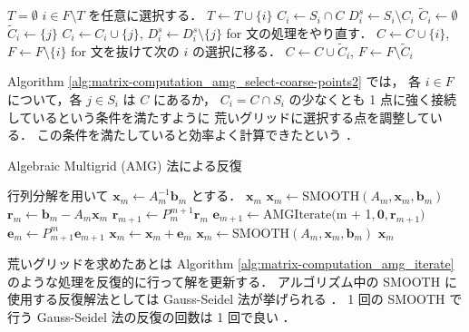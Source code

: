 \begin{algorithm}[tp]
    \caption{Algebraic Multigrid (AMG) 法における荒いグリッドの点の選択（ステップ 2）%
        （\cite{Ruge1987} をもとに一部変更）}
    \label{alg:matrix-computation_amg_select-coarse-points2}
    \begin{algorithmic}
        \State $T = \emptyset$
        \State $i \in F \setminus T$ を任意に選択する．
        \State $T \gets T \cup \{i\}$
        \State $C_i \gets S_i \cap C$
        \State $D_i^s \gets S_i \setminus C_i$
        \State $\tilde{C}_i \gets \emptyset$
        \State $\tilde{C}_i \gets \{j\}$
        \State $C_i \gets C_i \cup \{j\}$, $D_i^s \gets D_i^s \setminus \{j\}$
        \State for 文の処理をやり直す．
        \Else
        \State $C \gets C \cup \{i\}$, $F \gets F \setminus \{i\}$
        \State for 文を抜けて次の $i$ の選択に移る．
        \EndIf
        \EndIf
        \EndFor
        \State $C \gets C \cup \tilde{C}_i$, $F \gets F \setminus \tilde{C}_i$
        \EndWhile
        \EndProcedure
    \end{algorithmic}
\end{algorithm}

Algorithm \ref{alg:matrix-computation_amg_select-coarse-points2}
では，
各 $i \in F$ について，各 $j \in S_i$ は $C$ にあるか，
$C_i = C \cap S_i$ の少なくとも 1 点に強く接続しているという条件を満たすように
荒いグリッドに選択する点を調整している．
この条件を満たしていると効率よく計算できたという
\cite{Ruge1987}．

\begin{algorithm}[tp]
    \caption{Algebraic Multigrid (AMG) 法による反復 \cite{Wolters2002}}
    \label{alg:matrix-computation_amg_iterate}
    \begin{algorithmic}
        \State 行列分解を用いて $\bm{x}_m \gets A_m^{-1} \bm{b}_m$ とする．
        \State \Return $\bm{x}_m$
        \EndIf
        \State $\bm{x}_m \gets \mathrm{SMOOTH}(A_m, \bm{x}_m, \bm{b}_m)$
        \State $\bm{r}_m \gets \bm{b}_m - A_m \bm{x}_m$
        \State $\bm{r}_{m+1} \gets P_{m}^{m+1} \bm{r}_m$
        \State $\bm{e}_{m+1} \gets \mathrm{AMGIterate}($m + 1$, \bm{0}, \bm{r}_{m+1})$
        \State $\bm{e}_m \gets P_{m+1}^{m} \bm{e}_{m+1}$
        \State $\bm{x}_m \gets \bm{x}_m + \bm{e}_m$
        \State $\bm{x}_m \gets \mathrm{SMOOTH}(A_m, \bm{x}_m, \bm{b}_m)$
        \State \Return $\bm{x}_m$
        \EndProcedure
    \end{algorithmic}
\end{algorithm}

荒いグリッドを求めたあとは
Algorithm \ref{alg:matrix-computation_amg_iterate}
のような処理を反復的に行って解を更新する．
アルゴリズム中の SMOOTH に使用する反復解法としては
Gauss-Seidel 法が挙げられる
\cite{Ruge1987,Wolters2002}．
1 回の SMOOTH で行う Gauss-Seidel 法の反復の回数は 1 回で良い
\cite{Wolters2002}．
